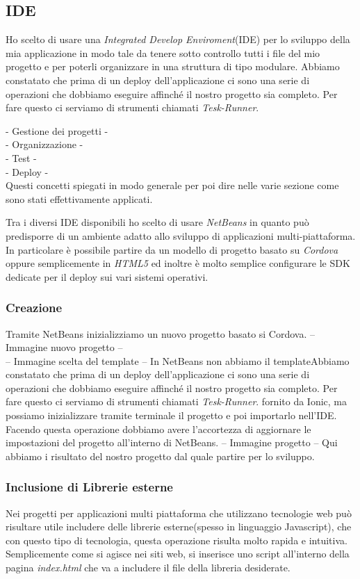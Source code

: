 \subsection{IDE}
Ho scelto di usare una \emph{Integrated Develop Enviroment}(IDE) per lo sviluppo della mia applicazione in modo tale da tenere sotto controllo tutti i file del mio progetto e per poterli organizzare in una struttura di tipo modulare. Abbiamo constatato che prima di un deploy dell'applicazione ci sono una serie di operazioni che dobbiamo eseguire affinché il nostro progetto sia completo. Per fare questo ci serviamo di strumenti chiamati \emph{Tesk-Runner}.

- Gestione dei progetti -\\
- Organizzazione -\\
- Test -\\
- Deploy -\\
Questi concetti spiegati in modo generale per poi dire nelle varie sezione come sono stati effettivamente applicati.

Tra i diversi IDE disponibili ho scelto di usare \emph{NetBeans} in quanto può predisporre di un ambiente adatto allo sviluppo di applicazioni multi-piattaforma. In particolare è possibile partire da un modello di progetto basato su \emph{Cordova} oppure semplicemente in \emph{HTML5} ed inoltre è molto semplice configurare le SDK dedicate per il deploy sui vari sistemi operativi.

\subsubsection{Creazione}
Tramite NetBeans inizializziamo un nuovo progetto basato si Cordova.
-- Immagine nuovo progetto --\\
-- Immagine scelta del template --
In NetBeans non abbiamo il templateAbbiamo constatato che prima di un deploy dell'applicazione ci sono una serie di operazioni che dobbiamo eseguire affinché il nostro progetto sia completo. Per fare questo ci serviamo di strumenti chiamati \emph{Tesk-Runner}. fornito da Ionic, ma possiamo inizializzare tramite terminale il progetto e poi importarlo nell'IDE. Facendo questa operazione dobbiamo avere l'accortezza di aggiornare le impostazioni del progetto all'interno di NetBeans.
-- Immagine progetto --
Qui abbiamo i risultato del nostro progetto dal quale partire per lo sviluppo.

\subsubsection{Inclusione di Librerie esterne}
Nei progetti per applicazioni multi piattaforma che utilizzano tecnologie web può risultare utile includere delle librerie esterne(spesso in linguaggio Javascript), che con questo tipo di tecnologia, questa operazione risulta molto rapida e intuitiva. \\
Semplicemente come si agisce nei siti web, si inserisce uno script all'interno della pagina \emph{index.html} che va a includere il file della libreria desiderate.

